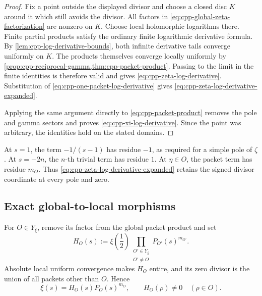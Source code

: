 \begin{proof}
Fix a point outside the displayed divisor and choose a closed disc \(K\)
around it which still avoids the divisor.  All factors in
\eqref{eq:cpp-global-zeta-factorization} are nonzero on \(K\).  Choose local
holomorphic logarithms there.  Finite partial products satisfy the ordinary
finite logarithmic derivative formula.  By
\cref{lem:cpp-log-derivative-bounds}, both infinite derivative tails converge
uniformly on \(K\).  The products themselves converge locally uniformly by
\cref{prop:cpp-reciprocal-gamma,thm:cpp-packet-product}.  Passing to the limit
in the finite identities is therefore valid and gives
\eqref{eq:cpp-zeta-log-derivative}.  Substitution of
\cref{eq:cpp-one-packet-log-derivative} gives
\eqref{eq:cpp-zeta-log-derivative-expanded}.

Applying the same argument directly to
\eqref{eq:cpp-packet-product} removes the pole and gamma sectors and proves
\eqref{eq:cpp-xi-log-derivative}.  Since the point was arbitrary, the
identities hold on the stated domains.
\end{proof}

\begin{remark}
At \(s=1\), the term \(-1/(s-1)\) has residue \(-1\), as required for a
simple pole of \(\zeta\).  At \(s=-2n\), the \(n\)-th trivial term has residue
\(1\).  At \(\eta\in O\), the packet term has residue \(m_O\).  Thus
\cref{eq:cpp-zeta-log-derivative-expanded} retains the signed divisor
coordinate at every pole and zero.
\end{remark}

\subsection{Exact global-to-local morphisms}

For \(O\in Y_\xi\), remove its factor from the global packet product and set
\begin{equation}
\label{eq:cpp-complementary-factor}
 H_O(s)
 :=
 \xi\!\left(\frac12\right)
 \prod_{\substack{O'\in Y_\xi\\O'\ne O}}
 P_{O'}(s)^{m_{O'}}.
\end{equation}
Absolute local uniform convergence makes \(H_O\) entire, and its zero divisor
is the union of all packets other than \(O\).  Hence
\begin{equation}
\label{eq:cpp-packet-complement-decomposition}
 \xi(s)=H_O(s)P_O(s)^{m_O},
 \qquad
 H_O(\rho)\ne0\quad(\rho\in O).
\end{equation}

